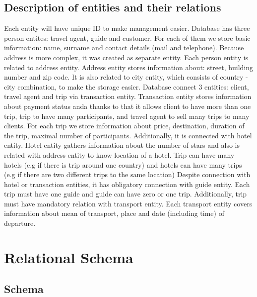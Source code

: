 \documentclass{article}
\begin{document}
\subsection{Description of entities and their relations}
Each entity will have unique ID to make management easier.
Database has three person entites: travel agent, guide and customer. 
For each of them we store basic information: name, surname and contact details (mail and telephone).
Because address is more complex, it was created as separate entity.
Each person entity is related to address entity.
Address entity stores information about: street, building number and zip code.
It is also related to city entity, which consists of country - city combination, to make the storage easier.
Database connect 3 entities: client, travel agent and trip via transaction entity.
Transaction entity stores information about payment status anda thanks to that it allows client to have more than one trip, trip to have many participants, and travel agent to sell many trips to many clients.
For each trip we store information about price, destination, duration of the trip, maximal number of participants.
Additionally, it is connected with hotel entity.
Hotel entity gathers information about the number of stars and also is related with address entity to know location of a hotel.
Trip can have many hotels (e.g if there is trip around one country) and hotels can have many trips (e.g if there are two different trips to the same location)
Despite connection with hotel or transaction entities, it has obligatory connection with guide entity.
Each trip must have one guide and guide can have zero or one trip.
Additionally, trip must have mandatory relation with transport entity.
Each transport entity covers information about mean of transport, place and date (including time) of departure.

\newpage
\section{Relational Schema}
\subsection{Schema}
\begin{figure}[ht]
\end{figure}
\end{document}
